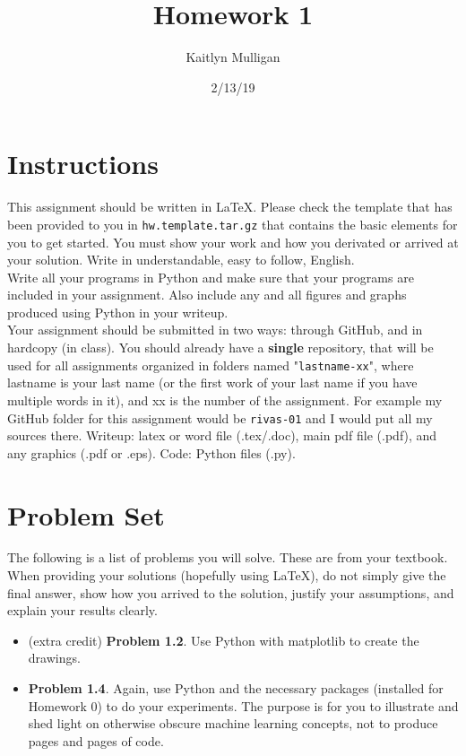 \documentclass[a4paper]{article}
\title{Homework 1}
\author{Kaitlyn Mulligan}
\date{2/13/19}
\newcommand\tab[1][0.5cm]{\hspace*{#1}}
\begin{document}
\lstset{language=Python}

\maketitle

\section{Instructions}
This assignment should be written in \LaTeX.  Please check the template that 
has been provided to you in \verb|hw.template.tar.gz| that contains the basic elements for 
you to get started.  You must show your work and how you derivated or arrived at your 
solution.  Write in understandable, easy to follow, English.\\
\tab Write all your programs in Python and make sure that your programs are included 
in your assignment.  Also include any and all figures and graphs produced using Python 
in your writeup.\\
\tab Your assignment should be submitted in two ways: through GitHub, and in hardcopy 
(in class).  You should already have a \textbf{single} repository, that will be used 
for all assignments organized in folders named "\verb|lastname-xx|", where lastname is your 
last name (or the first work of your last name if you have multiple words in it), and 
xx is the number of the assignment.  For example my GitHub folder for this assignment 
would be \verb|rivas-01| and I would put all my sources there.  Writeup: latex or word file 
(.tex/.doc), main pdf file (.pdf), and any graphics (.pdf or .eps).  Code: Python 
files (.py).


\section{Problem Set}
The following is a list of problems you will solve.  These are from your textbook.  When 
providing your solutions (hopefully using \LaTeX), do not simply give the final answer, 
show how you arrived to the solution, justify your assumptions, and explain your results 
clearly.
\begin{itemize}
    \item (extra credit) \textbf{Problem 1.2}. Use Python with matplotlib to create the 
    drawings.
    \item \textbf{Problem 1.4}. Again, use Python and the necessary packages (installed 
    for Homework 0) to do your experiments.  The purpose is for you to illustrate and shed 
    light on otherwise obscure machine learning concepts, not to produce pages and pages of 
    code.
\end{itemize}
\end{document}
